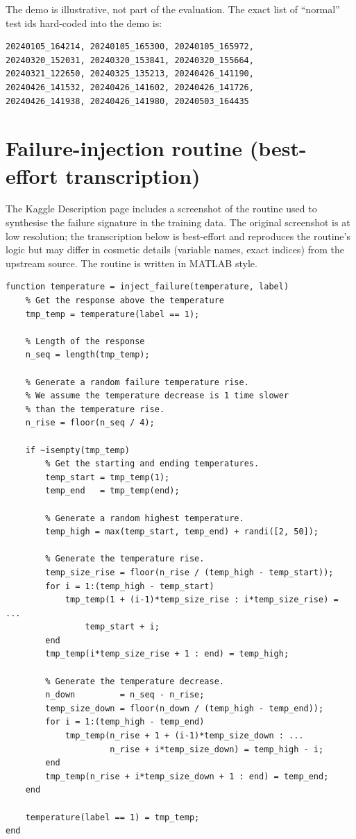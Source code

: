 \documentclass[11pt,a4paper]{article}
\begin{document}
The demo is illustrative, not part of the evaluation. The exact list of
``normal'' test ids hard-coded into the demo is:

\begin{verbatim}
20240105_164214, 20240105_165300, 20240105_165972,
20240320_152031, 20240320_153841, 20240320_155664,
20240321_122650, 20240325_135213, 20240426_141190,
20240426_141532, 20240426_141602, 20240426_141726,
20240426_141938, 20240426_141980, 20240503_164435
\end{verbatim}

\section{Failure-injection routine (best-effort transcription)}
\label{sec:appendix-injection}

The Kaggle Description page includes a screenshot of the routine used to
synthesise the failure signature in the training data. The original screenshot
is at low resolution; the transcription below is best-effort and reproduces
the routine's logic but may differ in cosmetic details (variable names,
exact indices) from the upstream source. The routine is written in MATLAB
style.

\begin{lstlisting}[style=matlab]
function temperature = inject_failure(temperature, label)
    % Get the response above the temperature
    tmp_temp = temperature(label == 1);

    % Length of the response
    n_seq = length(tmp_temp);

    % Generate a random failure temperature rise.
    % We assume the temperature decrease is 1 time slower
    % than the temperature rise.
    n_rise = floor(n_seq / 4);

    if ~isempty(tmp_temp)
        % Get the starting and ending temperatures.
        temp_start = tmp_temp(1);
        temp_end   = tmp_temp(end);

        % Generate a random highest temperature.
        temp_high = max(temp_start, temp_end) + randi([2, 50]);

        % Generate the temperature rise.
        temp_size_rise = floor(n_rise / (temp_high - temp_start));
        for i = 1:(temp_high - temp_start)
            tmp_temp(1 + (i-1)*temp_size_rise : i*temp_size_rise) = ...
                temp_start + i;
        end
        tmp_temp(i*temp_size_rise + 1 : end) = temp_high;

        % Generate the temperature decrease.
        n_down         = n_seq - n_rise;
        temp_size_down = floor(n_down / (temp_high - temp_end));
        for i = 1:(temp_high - temp_end)
            tmp_temp(n_rise + 1 + (i-1)*temp_size_down : ...
                     n_rise + i*temp_size_down) = temp_high - i;
        end
        tmp_temp(n_rise + i*temp_size_down + 1 : end) = temp_end;
    end

    temperature(label == 1) = tmp_temp;
end
\end{lstlisting}
\end{document}

